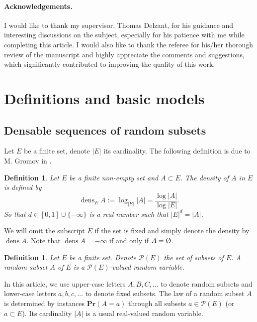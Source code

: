 \documentclass{article}
\DeclareMathOperator{\dens}{dens}
\newcommand{\vide}{\textup{\O}}
\def\Pr{\mathbf{Pr}}
\newtheorem{defi}[thm]{Definition}
\theoremstyle{remark}
\begin{document}
\paragraph{Acknowledgements.} I would like to thank my supervisor, Thomas Delzant, for his guidance and interesting discussions on the subject, especially for his patience with me while completing this article. I would also like to thank the referee for his/her thorough review of the manuscript and highly appreciate the comments and suggestions, which significantly contributed to improving the quality of this work.

\section{Definitions and basic models}

\subsection{Densable sequences of random subsets}

Let $E$ be a finite set, denote $|E|$ its cardinality. The following definition is due to M. Gromov in \cite{Gro93}.

\begin{defi} Let $E$ be a finite non-empty set and $A\subset E$. The density of $A$ in $E$ is defined by
\[\dens_E A := \log_{|E|}|A| = \frac{\log |A|}{\log |E|}.\]
So that $d\in[0,1]\cup\{-\infty\}$ is a real number such that $|E|^d = |A|$.
\end{defi}

We will omit the subscript $E$ if the set is fixed and simply denote the density by $\dens A$. Note that $\dens A = -\infty$ if and only if $A = \vide$.\\
\begin{defi}
Let $E$ be a finite set. Denote $\mathcal{P}(E)$ the set of subsets of $E$. A random subset $A$ of $E$ is a $\mathcal{P}(E)$-valued random variable.
\end{defi}

In this article, we use upper-case letters $A,B,C,\dots$ to denote random subsets and lower-case letters $a,b,c,\dots$ to denote fixed subsets. The law of a random subset $A$ is determined by instances $\Pr(A = a)$ through all subsets $a\in \mathcal{P}(E)$ (or $a\subset E$). Its cardinality $|A|$ is a usual real-valued random variable.\\
\end{document}
